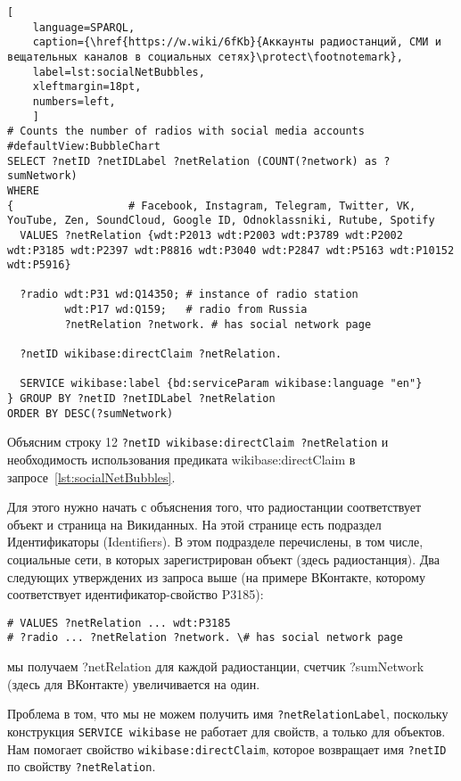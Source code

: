 \begin{lstlisting}[ 
    language=SPARQL,
    caption={\href{https://w.wiki/6fKb}{Аккаунты радиостанций, СМИ и вещательных каналов в социальных сетях}\protect\footnotemark},
    label=lst:socialNetBubbles,
    xleftmargin=18pt,
    numbers=left,
    ]
# Counts the number of radios with social media accounts
#defaultView:BubbleChart
SELECT ?netID ?netIDLabel ?netRelation (COUNT(?network) as ?sumNetwork)
WHERE
{                  # Facebook, Instagram, Telegram, Twitter, VK, YouTube, Zen, SoundCloud, Google ID, Odnoklassniki, Rutube, Spotify
  VALUES ?netRelation {wdt:P2013 wdt:P2003 wdt:P3789 wdt:P2002 wdt:P3185 wdt:P2397 wdt:P8816 wdt:P3040 wdt:P2847 wdt:P5163 wdt:P10152 wdt:P5916}
  
  ?radio wdt:P31 wd:Q14350; # instance of radio station
         wdt:P17 wd:Q159;   # radio from Russia
         ?netRelation ?network. # has social network page

  ?netID wikibase:directClaim ?netRelation.
  
  SERVICE wikibase:label {bd:serviceParam wikibase:language "en"}
} GROUP BY ?netID ?netIDLabel ?netRelation 
ORDER BY DESC(?sumNetwork)\end{lstlisting}%


Объясним строку 12 \lstinline|?netID wikibase:directClaim ?netRelation| и необходимость использования предиката wikibase:directClaim в запросе~\ref{lst:socialNetBubbles}.

Для этого нужно начать с объяснения того, что радиостанции соответствует объект и страница на Викиданных. На этой странице есть подраздел Идентификаторы (Identifiers). В этом подразделе перечислены, в том числе, социальные сети, в которых зарегистрирован объект (здесь радиостанция). Два следующих утверждених из запроса выше (на примере ВКонтакте, которому соответствует идентификатор-свойство P3185):

\begin{lstlisting}
# VALUES ?netRelation ... wdt:P3185
# ?radio ... ?netRelation ?network. \# has social network page
\end{lstlisting}

мы получаем ?netRelation для каждой радиостанции, счетчик ?sumNetwork (здесь для ВКонтакте) увеличивается на один.

Проблема в том, что мы не можем получить имя \lstinline|?netRelationLabel|, поскольку конструкция \lstinline|SERVICE wikibase| не работает для свойств, а только для объектов. Нам помогает свойство \lstinline|wikibase:directClaim|, которое возвращает имя \lstinline|?netID| по свойству \lstinline|?netRelation|.


